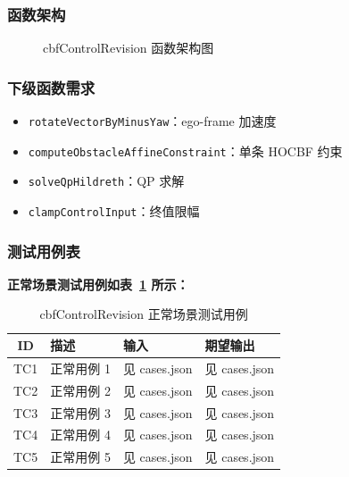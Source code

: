 \documentclass[a4paper,10pt]{article}
\begin{document}
\subsubsection{函数架构}
\begin{figure}[h]
    \centering
    \caption{cbfControlRevision 函数架构图}
    \label{fig:arch_cbfControlRevision}
\end{figure}
\subsubsection{下级函数需求}
\begin{itemize}
  \item \texttt{rotateVectorByMinusYaw}：ego-frame 加速度
  \item \texttt{computeObstacleAffineConstraint}：单条 HOCBF 约束
  \item \texttt{solveQpHildreth}：QP 求解
  \item \texttt{clampControlInput}：终值限幅
\end{itemize}

\subsubsection{测试用例表}
\noindent\textbf{正常场景测试用例如表~\ref{tab:normal_cbfControlRevision} 所示：}
\begin{table}[h]
\centering
\caption{cbfControlRevision 正常场景测试用例}
\label{tab:normal_cbfControlRevision}
\begin{tabular}{|c|p{3.5cm}|p{3.5cm}|p{3.5cm}|}
\hline
ID & 描述 & 输入 & 期望输出 \\ \hline
  TC1 & 正常用例 1 & 见 cases.json & 见 cases.json \\ \hline
  TC2 & 正常用例 2 & 见 cases.json & 见 cases.json \\ \hline
  TC3 & 正常用例 3 & 见 cases.json & 见 cases.json \\ \hline
  TC4 & 正常用例 4 & 见 cases.json & 见 cases.json \\ \hline
  TC5 & 正常用例 5 & 见 cases.json & 见 cases.json \\ \hline
\end{tabular}
\end{table}
\end{document}
